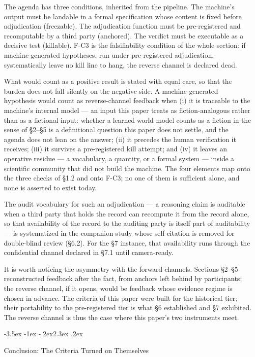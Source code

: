 \documentclass[11pt,a4paper]{article}
\makeatletter
\renewcommand\section{\@startsection{section}{1}{\z@}%
  {-3.5ex \@plus -1ex \@minus -.2ex}{2.3ex \@plus .2ex}%
  {\normalfont\Large\bfseries\raggedright}}
\makeatother
\begin{document}
The agenda has three conditions, inherited from the pipeline. The machine's output must be landable in a formal specification whose content is fixed before adjudication (freezable). The adjudication function must be pre-registered and recomputable by a third party (anchored). The verdict must be executable as a decisive test (killable). F-C3 is the falsifiability condition of the whole section: if machine-generated hypotheses, run under pre-registered adjudication, systematically leave no kill line to hang, the reverse channel is declared dead.

What would count as a positive result is stated with equal care, so that the burden does not fall silently on the negative side. A machine-generated hypothesis would count as reverse-channel feedback when (i) it is traceable to the machine's internal model — an input this paper treats as fiction-analogous rather than as a fictional input: whether a learned world model counts as a fiction in the sense of §2–§5 is a definitional question this paper does not settle, and the agenda does not lean on the answer; (ii) it precedes the human verification it receives; (iii) it survives a pre-registered kill attempt; and (iv) it leaves an operative residue — a vocabulary, a quantity, or a formal system — inside a scientific community that did not build the machine. The four elements map onto the three checks of §1.2 and onto F-C3; no one of them is sufficient alone, and none is asserted to exist today.

The audit vocabulary for such an adjudication — a reasoning claim is auditable when a third party that holds the record can recompute it from the record alone, so that availability of the record to the auditing party is itself part of auditability — is systematized in the companion study whose self-citation is removed for double-blind review (§6.2). For the §7 instance, that availability runs through the confidential channel declared in §7.1 until camera-ready.

It is worth noticing the asymmetry with the forward channels. Sections §2–§5 reconstructed feedback after the fact, from anchors left behind by participants; the reverse channel, if it opens, would be feedback whose evidence regime is chosen in advance. The criteria of this paper were built for the historical tier; their portability to the pre-registered tier is what §6 established and §7 exhibited. The reverse channel is thus the case where this paper's two instruments meet.

\section{Conclusion: The Criteria Turned on Themselves}
\end{document}
